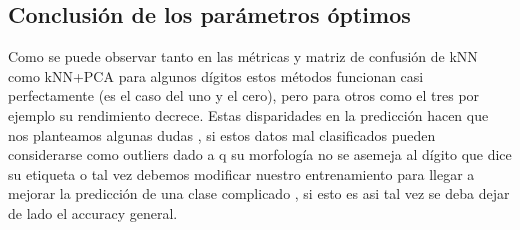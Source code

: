 \subsection{Conclusión de los parámetros óptimos}


Como se puede observar tanto en las métricas y matriz de confusión de kNN como kNN+PCA para algunos dígitos estos métodos funcionan casi perfectamente (es el caso del uno y el cero), pero para otros como el tres por ejemplo su rendimiento decrece. Estas disparidades en la predicción hacen que nos planteamos algunas dudas , si estos datos mal clasificados pueden considerarse como outliers dado a q su morfología no se asemeja al dígito que dice su etiqueta o tal vez debemos modificar nuestro entrenamiento para llegar a mejorar la predicción de una clase complicado , si esto es asi tal vez se deba dejar de lado el accuracy general.


